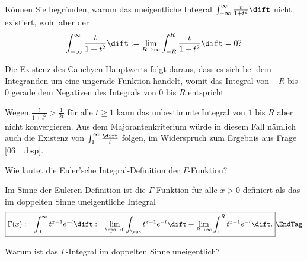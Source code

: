   \begin{frage}
    Können Sie begründen, warum das uneigentliche Integral 
    $\int_{-\infty}^\infty \frac{t}{1+t^2} \dift$ nicht 
    existiert, wohl aber der 
    \[
    \int_{-\infty}^\infty \frac{t}{1+t^2} \dift := 
    \lim_{R\to\infty} \int_{-R}^R \frac{t}{1+t^2} \dift = 0 
    \text{?}
    \]
  \end{frage}

  \begin{antwort}
    Die Existenz des Cauchy\sch en Hauptwerts folgt daraus, dass es sich bei 
    dem Integranden um eine ungerade Funktion handelt, womit das Integral 
    von $-R$ bis $0$ gerade dem Negativen des Integrals von $0$ bis $R$ 
    entspricht. 

    Wegen $\frac{t}{1+t^2}>\frac{1}{2t}$ für alle $t\ge 1$ kann 
    das unbestimmte Integral von $1$ bis $R$ aber nicht konvergieren. 
    Aus dem Majorantenkriterium würde in diesem Fall nämlich auch 
    die Existenz von $\int_1^\infty \frac{\dift}{t}$ folgen, im 
    Widerspruch zum Ergebnis aus Frage \ref{06_ubsp}. 
    \AntEnd 
  \end{antwort}

  \begin{frage}\label{06_gamk}
    Wie lautet die Euler'sche Integral-Definition der $\Gamma$-Funktion? 
  \end{frage}

  \begin{antwort}
    Im Sinne der Euler\sch en Definition 
    ist die $\Gamma$-Funktion für alle $x>0$ definiert als das im doppelten 
    Sinne uneigentliche Integral
    \[\boxed{
      \Gamma( x ) := \int_0^\infty t^{x-1}e^{-t} \dift 
      := \lim_{\eps\to 0} \int_{\eps}^1 t^{x-1}e^{-t}\dift + 
      \lim_{R \to \infty} \int_{1}^R t^{x-1}e^{-t}\dift.
    }
    \EndTag
    \]
  \end{antwort} 

  \begin{frage}
    Warum ist das $\Gamma$-Integral im doppelten Sinne uneigentlich?
  \end{frage}

